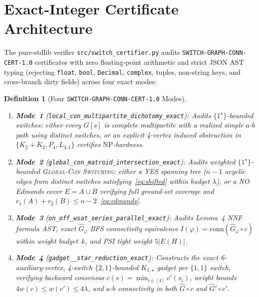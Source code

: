 \documentclass[11pt,twocolumn]{article}
\newtheorem{definition}{Definition}
\begin{document}
\section{Exact-Integer Certificate Architecture}\label{sec:certifier}
The pure-stdlib verifier \texttt{src/switch\_certifier.py} audits \texttt{SWITCH-GRAPH-CONN-CERT-1.0} certificates with zero floating-point arithmetic and strict JSON AST typing (rejecting \texttt{float}, \texttt{bool}, \texttt{Decimal}, \texttt{complex}, tuples, non-string keys, and cross-branch dirty fields) across four exact modes:

\begin{definition}[Four \texttt{SWITCH-GRAPH-CONN-CERT-1.0} Modes]\label{def:modes}
\leavevmode
\begin{enumerate}[leftmargin=*,nosep]
  \item \textbf{Mode~1} (\texttt{\small local\_\allowbreak con\_\allowbreak multipartite\_\allowbreak dichotomy\_\allowbreak exact}): Audits $\{1^\star\}$-bounded switches: either every $G[s]$ is complete multipartite with a realized simple $a$-$b$ path using distinct switches, or an explicit 4-vertex induced obstruction in $\{K_2{+}K_2, P_4, L_{3,1}\}$ certifies $\mathrm{NP}$-hardness.
  \item \textbf{Mode~2} (\texttt{\small global\_\allowbreak con\_\allowbreak matroid\_\allowbreak intersection\_\allowbreak exact}): Audits weighted $\{1^\star\}$-bounded \textsc{Global-Con Switching}: either a YES spanning tree ($n{-}1$ acyclic edges from distinct switches satisfying~\eqref{eq:shifted} within budget $\lambda$), or a NO Edmonds cover $E = A \cup B$ verifying full ground-set coverage and $r_1(A) + r_2(B) \le n - 2$~\eqref{eq:edmonds}.
  \item \textbf{Mode~3} (\texttt{\small on\_\allowbreak off\_\allowbreak wsat\_\allowbreak series\_\allowbreak parallel\_\allowbreak exact}): Audits Lemma~4 NNF formula AST, exact $\hat{G}_\varphi$ BFS connectivity equivalence $I(\varphi) = \mathrm{conn}(\hat{G}_\varphi \circ c)$ within weight budget~$k$, and PSI tight weight $5|E(H)|$.
  \item \textbf{Mode~4} (\texttt{\small gadget\_\_\allowbreak star\_\allowbreak reduction\_\allowbreak exact}): Constructs the exact 6-auxiliary-vertex, 4-switch $\{2,1\}$-bounded $K_{1,\star}$ gadget per $\{1,1\}$ switch, verifying backward consensus $c(s) = \min_{i\in[4]} c'(s_i)$, weight bounds $4w(c) \le w(c') \le 4\lambda$, and $a$-$b$ connectivity in both $\hat{G}\circ c$ and $\hat{G}'\circ c'$.
\end{enumerate}
\end{definition}
\end{document}
